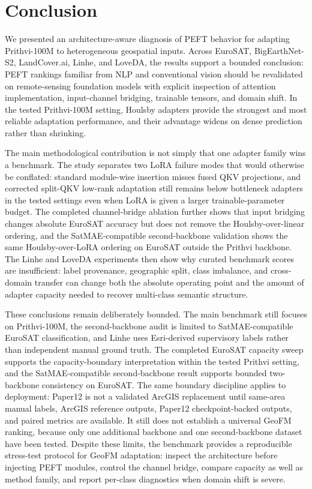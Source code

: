 \documentclass[11pt]{article}
\begin{document}
\section{Conclusion}

We presented an architecture-aware diagnosis of PEFT behavior for adapting Prithvi-100M to heterogeneous geospatial inputs. Across EuroSAT, BigEarthNet-S2, LandCover.ai, Linhe, and LoveDA, the results support a bounded conclusion: PEFT rankings familiar from NLP and conventional vision should be revalidated on remote-sensing foundation models with explicit inspection of attention implementation, input-channel bridging, trainable tensors, and domain shift. In the tested Prithvi-100M setting, Houlsby adapters provide the strongest and most reliable adaptation performance, and their advantage widens on dense prediction rather than shrinking.

The main methodological contribution is not simply that one adapter family wins a benchmark. The study separates two LoRA failure modes that would otherwise be conflated: standard module-wise insertion misses fused QKV projections, and corrected split-QKV low-rank adaptation still remains below bottleneck adapters in the tested settings even when LoRA is given a larger trainable-parameter budget. The completed channel-bridge ablation further shows that input bridging changes absolute EuroSAT accuracy but does not remove the Houlsby-over-linear ordering, and the SatMAE-compatible second-backbone validation shows the same Houlsby-over-LoRA ordering on EuroSAT outside the Prithvi backbone. The Linhe and LoveDA experiments then show why curated benchmark scores are insufficient: label provenance, geographic split, class imbalance, and cross-domain transfer can change both the absolute operating point and the amount of adapter capacity needed to recover multi-class semantic structure.

These conclusions remain deliberately bounded. The main benchmark still focuses on Prithvi-100M, the second-backbone audit is limited to SatMAE-compatible EuroSAT classification, and Linhe uses Esri-derived supervisory labels rather than independent manual ground truth. The completed EuroSAT capacity sweep supports the capacity-boundary interpretation within the tested Prithvi setting, and the SatMAE-compatible second-backbone result supports bounded two-backbone consistency on EuroSAT. The same boundary discipline applies to deployment: Paper12 is not a validated ArcGIS replacement until same-area manual labels, ArcGIS reference outputs, Paper12 checkpoint-backed outputs, and paired metrics are available. It still does not establish a universal GeoFM ranking, because only one additional backbone and one second-backbone dataset have been tested. Despite these limits, the benchmark provides a reproducible stress-test protocol for GeoFM adaptation: inspect the architecture before injecting PEFT modules, control the channel bridge, compare capacity as well as method family, and report per-class diagnostics when domain shift is severe.
\end{document}
